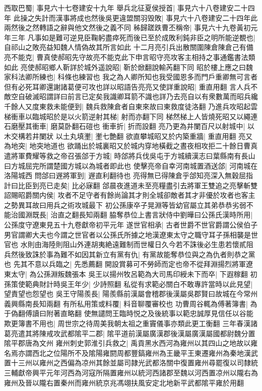 西取巴蜀|{
	事見六十七卷建安十九年}
舉兵北征夏侯授首|{
	事見六十八卷建安二十四年}
此操之失計而漢事將成也然後吳更違盟關羽毁敗|{
	事見六十八卷建安二十四年此兩然後之然轉語之辭與他文然後之義不同}
秭歸蹉跌曹丕稱帝|{
	事見六十九卷黃初元年三年}
凡事如是難可逆見臣鞠躬盡瘁死而後已至於成敗利鈍非臣之明所能逆覩也|{
	自祁山之敗亮益知魏人情偽故其所言如此}
十二月亮引兵出散關圍陳倉陳倉己有備亮不能克|{
	曹真使郝昭先守故亮不能克此下申言昭守亮攻客主相持之事通鑑書法類如此}
亮使郝昭鄉人靳詳於城外遥說昭|{
	靳於焮翻說輸芮翻下同}
昭於樓上應之曰魏家科法卿所練也|{
	科條也練習也}
我之為人卿所知也我受國恩多而門戶重卿無可言者但有必死耳卿還謝諸葛便可攻也詳以昭語告亮亮又使詳重說昭|{
	重直用翻}
言人兵不敵空自破滅昭謂詳曰前言已定矣我識卿耳箭不識也詳乃去亮自以有衆數萬而昭兵纔千餘人又度東救未能便到|{
	魏兵救陳倉者自東來故曰東救度徒洛翻}
乃進兵攻昭起雲梯衝車以臨城昭於是以火箭逆射其梯|{
	射而亦翻下同}
梯然梯上人皆燒死昭又以繩連石磨壓其衝車|{
	磨莫卧翻石磑也}
衝車折|{
	折而設翻}
亮乃更為井闌百尺以射城中|{
	以木交構若井闌狀}
以土丸填壍|{
	壍七艶翻}
欲直攀城昭又於内築重牆|{
	重直用翻}
亮又為地突|{
	地突地道也}
欲踊出於城裏昭又於城内穿地橫截之晝夜相攻拒二十餘日曹真遣將軍費耀等救之帝召張郃于方城|{
	時郃將兵伐吳屯于方城續漢志曰葉縣南有長山曰方城屈完所謂楚國方城以為城者即此也}
使擊亮帝自幸河南城置酒送郃|{
	河南城在洛陽城西}
問郃曰遟將軍到|{
	遟直利翻待也}
亮得無已得陳倉乎郃知亮深入無穀屈指計曰比臣到亮已走矣|{
	比必寐翻}
郃晨夜進道未至亮糧盡引去將軍王雙追之亮擊斬雙詔賜昭爵關内侯|{
	攻者不足守者有餘尚論其才則全城卻敵者其才非優於攻者也客主之勢異耳故曰用兵之術攻城最下}
初公孫康卒子晃淵等皆幼官屬立其弟恭恭劣弱不能治國淵既長|{
	治直之翻長知兩翻}
脇奪恭位上書言狀侍中劉曄曰公孫氏漢時所用|{
	公孫度守遼東見五十九卷獻帝初平元年}
遂世官相承|{
	古者世爵不世官爵謂公侯伯子男官謂卿大夫也今謂之世官者以公孫氏所據之地漢遼東太守之職守耳子孫相襲是世官也}
水則由海陸則阻山外連胡夷絶遠難制而世權日久今若不誅後必生患若懷貳阻兵然後致誅於事為難不如因其新立有黨有仇|{
	有黨故能奪恭位與之為仇者則恭之黨也}
先其不意以兵臨之|{
	先悉薦翻}
開設賞募可不勞師而定也帝不從拜淵揚烈將軍遼東太守|{
	為公孫淵叛魏張本}
吳王以揚州牧呂範為大司馬印綬未下而卒|{
	下遐稼翻}
初孫策使範典財計時吳王年少|{
	少詩照翻}
私從有求範必關白不敢專許當時以此見望|{
	望責望也怨望也}
吳王守陽羨長|{
	陽羨縣前漢屬會稽郡後漢屬吳郡賢曰故城在今常州義興縣南長知兩翻}
有所私用策或料覆|{
	料音聊覆審校也}
功曹周谷輒為傅著簿書|{
	為于偽翻傅讀曰附著直略翻}
使無譴問王臨時悦之及後統事以範忠誠厚見信任以谷能欺更簿書不用也|{
	周世宗之待周美我朝太祖之重竇儀事亦類此更工衡翻}
三年春漢諸葛亮遣其將陳戒攻武都隂平二郡|{
	隂平道前漢屬廣漢郡後漢屬廣漢屬國都尉魏分置隂平郡唐為文州}
雍州刺史郭淮引兵救之|{
	禹貢黑水西河為雍州以其四山之地故以雍名焉亦謂西北之位陽所不及隂陽雍閼周都豐鎬雍州為王畿平王東遷雍州為秦地漢武置十三州以雍州之西偏為凉州其餘並屬司隷光武都洛關中復置雍州尋罷復以司隸統三輔獻帝興平元年河西為河寇所隔置雍州以統河西諸郡至魏以河西置凉州以隴右為雍州及晉以隴右置秦州而雍州統京兆馮翊扶風安定北地新平武都隂平雍於用翻}
